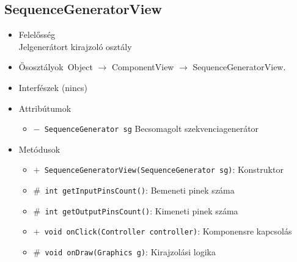 \subsection{SequenceGeneratorView}
\begin{itemize}
\item Felelősség\\
Jelgenerátort kirajzoló osztály
\item Ősosztályok\ Object $\rightarrow{}$ ComponentView $\rightarrow{}$ SequenceGeneratorView.
\item Interfészek (nincs)
\item Attribútumok $\ $
\begin{itemize}
	\item[] \texttt{$-$ SequenceGenerator sg} Becsomagolt szekvenciagenerátor
\end{itemize}
\item Metódusok$\ $
\begin{itemize}
	\item[] \texttt{$+$ SequenceGeneratorView(SequenceGenerator sg)}: Konstruktor
	\item[] \texttt{$\#$ int getInputPinsCount()}: Bemeneti pinek száma
	\item[] \texttt{$\#$ int getOutputPinsCount()}: Kimeneti pinek száma
	\item[] \texttt{$+$ void onClick(Controller controller)}: Komponensre kapcsolás
	\item[] \texttt{$\#$ void onDraw(Graphics g)}: Kirajzolási logika
\end{itemize}
\end{itemize}

